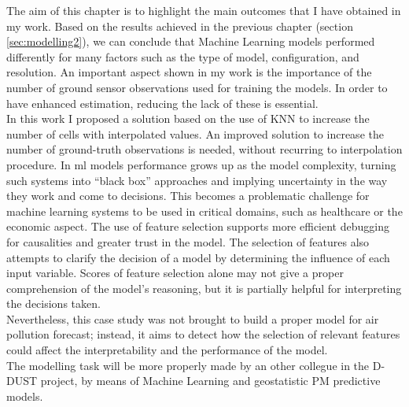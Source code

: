 The aim of this chapter is to highlight the main outcomes that I have obtained in my work.
Based on the results achieved in the previous chapter (section \ref{sec:modelling2}), we can conclude that Machine Learning models performed differently for many factors such as the type of model, configuration, and resolution.
An important aspect shown in my work is the importance of the number of ground sensor observations used for training the models. In order to have enhanced estimation, reducing the lack of these is essential.\\
In this work I proposed a solution based on the use of KNN to increase the number of cells with interpolated values. An improved solution to increase the number of ground-truth observations is needed, without recurring to interpolation procedure.
In \acrshort{ml} models performance grows up as the model complexity, turning such systems into “black box” approaches and implying uncertainty in the way they work and come to decisions. 
This becomes a problematic challenge for machine learning systems to be used in critical domains, such as healthcare or the economic aspect.
The use of feature selection supports more efficient debugging for causalities and greater trust in the model.
The selection of features also attempts to clarify the decision of a model by determining the influence of each input variable. 
Scores of feature selection alone may not give a proper comprehension of the model’s reasoning, but it is partially helpful for interpreting the decisions taken.\\
Nevertheless, this case study was not brought to build a proper model for air pollution forecast; instead, it aims to detect how the selection of relevant features could affect the interpretability and the performance of the model. \\
The modelling task will be more properly made by an other collegue in the D-DUST project, by means of Machine Learning and geostatistic PM predictive models.\\
\begin{comment}
The present study confirmed the findings about the model performance which does not decrease if a feature selection is applied, in particular when we have to deal with a limited sample of data \cite{vabalas2019machine}. 
he more the training sample size is limited, the more an accurate selection of the most weighted variables is needed to increase its performance.
We can say that the feature selection application is necessary but not a sufficient condition to have an increment in the model performance.
\end{comment}
